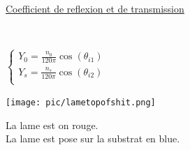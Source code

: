 \documentclass[12pt]{book}
\begin{document}
            \pagebreak
            \underline{Coefficient de reflexion et de transmission} \\
            \begin{center}
                 \vspace*{20px}
                 \\
                \begin{minipage}{0.3\linewidth}
                    $\begin{cases}
                        Y_0 = \frac{n_0}{120\pi}\cos(\theta_{i1}) \\
                        Y_s = \frac{n_s}{120\pi}\cos(\theta_{i2}) \\
                    \end{cases}$
                \end{minipage}
                \begin{minipage}{0.2\linewidth}
                    \texttt{[image: pic/lametopofshit.png]}\\

                \end{minipage}
                \begin{minipage}{0.29\linewidth}
                    La lame est on rouge. \\
                    La lame est pose sur la substrat en blue.
                \end{minipage}
            \end{center}
\end{document}
